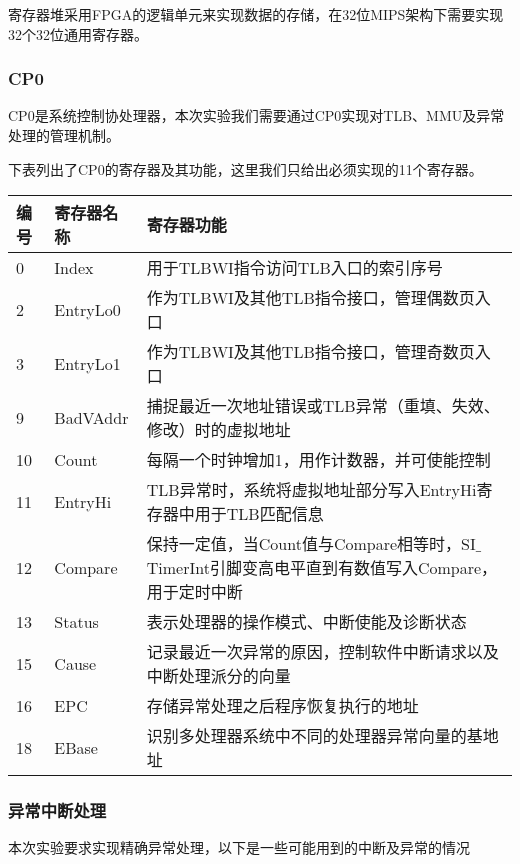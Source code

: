 寄存器堆采用FPGA的逻辑单元来实现数据的存储，在32位MIPS架构下需要实现32个32位通用寄存器。

\subsubsection{CP0}
CP0是系统控制协处理器，本次实验我们需要通过CP0实现对TLB、MMU及异常处理的管理机制。

下表列出了CP0的寄存器及其功能，这里我们只给出必须实现的11个寄存器。

\begin{table}[H]
\centering
\begin{tabular}{lll}
\hline
编号&寄存器名称&寄存器功能\\
\hline
0&Index&用于TLBWI指令访问TLB入口的索引序号\\
2&EntryLo0&作为TLBWI及其他TLB指令接口，管理偶数页入口\\
3&EntryLo1&作为TLBWI及其他TLB指令接口，管理奇数页入口\\
9&BadVAddr&捕捉最近一次地址错误或TLB异常（重填、失效、修改）时的虚拟地址\\
10&Count&每隔一个时钟增加1，用作计数器，并可使能控制\\
11&EntryHi&TLB异常时，系统将虚拟地址部分写入EntryHi寄存器中用于TLB匹配信息\\
12&Compare&保持一定值，当Count值与Compare相等时，SI$\_$TimerInt引脚变高电平直到有数值写入Compare，用于定时中断\\
13&Status&表示处理器的操作模式、中断使能及诊断状态\\
15&Cause&记录最近一次异常的原因，控制软件中断请求以及中断处理派分的向量\\
16&EPC&存储异常处理之后程序恢复执行的地址\\
18&EBase&识别多处理器系统中不同的处理器异常向量的基地址\\
\hline
\end{tabular}
\end{table}

\subsubsection{异常中断处理}
本次实验要求实现精确异常处理，以下是一些可能用到的中断及异常的情况


